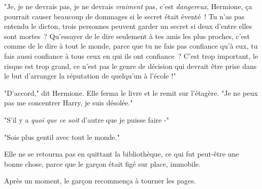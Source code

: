 "Je, je ne devrais pas, je ne devrais \emph{vraiment} pas, c'est \emph{dangereux}, Hermione, ça pourrait causer beaucoup de dommages si le secret était éventé~! Tu n'as pas entendu le dicton, trois personnes peuvent garder un secret si deux d'entre elles sont mortes~? Qu'essayer de le dire seulement à tes amis les plus proches, c'est comme de le dire à tout le monde, parce que tu ne fais pas confiance qu'à eux, tu fais aussi confiance à tous ceux en qui ils ont confiance~? C'est trop important, le risque est trop grand, ce n'est pas le genre de décision qui devrait être prise dans le but d'arranger la réputation de quelqu'un à l'école !"

"D'accord," dit Hermione. Elle ferma le livre et le remit sur l'étagère. "Je ne peux pas me concentrer Harry, je suis désolée."

"S'il y a \emph{quoi que ce soit} d'autre que je puisse faire -"

"Sois plus gentil avec tout le monde."

Elle ne se retourna pas en quittant la bibliothèque, ce qui fut peut-être une bonne chose, parce que le garçon était figé sur place, immobile.

Après un moment, le garçon recommença à tourner les pages. 

